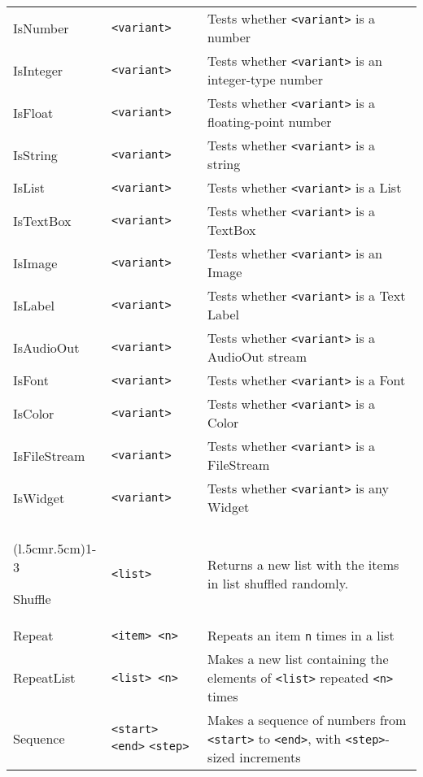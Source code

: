 \begin{longtable}{p{3cm}p{3cm}p{6cm}}
IsNumber      &     \verb+<variant>+ & 	Tests whether \verb+<variant>+ is a number \\
IsInteger     &     \verb+<variant>+ & 	Tests whether \verb+<variant>+ is an integer-type number\\
IsFloat       &     \verb+<variant>+ & 	Tests whether \verb+<variant>+ is a floating-point number\\
IsString      &     \verb+<variant>+ & 	Tests whether \verb+<variant>+ is a string\\
IsList        &     \verb+<variant>+ & 	Tests whether \verb+<variant>+ is a List\\
IsTextBox     &     \verb+<variant>+ & 	Tests whether \verb+<variant>+ is a TextBox\\
IsImage       &     \verb+<variant>+ & 	Tests whether \verb+<variant>+ is an Image\\
IsLabel       &     \verb+<variant>+ & 	Tests whether \verb+<variant>+ is a Text Label\\
IsAudioOut    &     \verb+<variant>+ & 	Tests whether \verb+<variant>+ is a AudioOut stream\\
IsFont        &     \verb+<variant>+ &	Tests whether \verb+<variant>+ is a Font\\
IsColor       &     \verb+<variant>+ & 	Tests whether \verb+<variant>+ is a Color\\
IsFileStream  &     \verb+<variant>+ & 	Tests whether \verb+<variant>+ is a FileStream\\
IsWidget      &     \verb+<variant>+ & 	Tests whether \verb+<variant>+ is any Widget\\

\addlinespace[0.2cm]
\midrule
\multicolumn{3}{c}{\textbf{List Manipulation Functions}}\\
\cmidrule(l{.5cm}r{.5cm}){1-3}

Shuffle     &      \verb+<list>+    & Returns a new list with the items in list shuffled randomly. \\
Repeat      &      \verb+<item> <n>+& Repeats an item \verb+n+ times in a list\\
RepeatList  & \verb+<list> <n>+     &  Makes a new list containing
                              the elements of \verb+<list>+ repeated  \verb+<n>+  times\\
Sequence    & \verb+<start>+ \verb+<end>+ \verb+<step>+ & Makes a sequence of numbers 
                           from \verb+<start>+ to \verb+<end>+, with \verb+<step>+-sized increments\\


\end{longtable}
